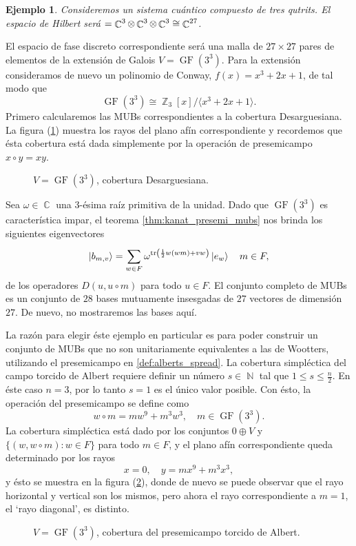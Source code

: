 \documentclass[a4paper]{report}
\DeclareMathOperator{\C}{\mathbb{C}}
\DeclareMathOperator{\N}{\mathbb{N}}
\DeclareMathOperator{\Z}{\mathbb{Z}}
\let\H\relax
\DeclareMathOperator{\H}{\mathcal H}
\DeclareMathOperator{\tr}{tr}
\DeclareMathOperator{\GF}{GF}
\newtheorem{example}{Ejemplo}
\begin{document}
  \begin{example}
    Consideremos un sistema cuántico compuesto de tres
    qutrits. El espacio de Hilbert será $\H = \C^{3} \otimes
    \C^{3} \otimes \C^{3} \cong \C^{27}$.   
    \label{ex:qs-3-3}
  \end{example}
  El espacio de fase discreto correspondiente será una malla
  de $27 \times 27$ pares de elementos de la extensión de
  Galois $V = \GF(3^{3})$. Para la extensión consideramos de
  nuevo un polinomio de Conway, $f(x) = x^3 + 2x + 1$, de
  tal modo que
  \[
    \GF(3^{3}) \cong \Z_3[x] / \langle x^3+2x+1 \rangle.
  \] 
  Primero calcularemos las MUBs correspondientes a la
  cobertura Desarguesiana. La figura
  (\ref{fig:3-3-desarguesian-plane}) muestra los rayos del
  plano afín correspondiente y recordemos que ésta cobertura
  está dada simplemente por la operación de presemicampo $x
  \circ y = xy$.
  \begin{figure}[ht]
    \centering
    
    \caption{$V = \GF(3^{3})$, cobertura Desarguesiana.}
    \label{fig:3-3-desarguesian-plane}
  \end{figure}
  Sea $\omega \in \C$ una $3$-ésima raíz primitiva de la
  unidad. Dado que $\GF(3^3)$ es característica impar, el
  teorema \ref{thm:kanat_presemi_mubs} nos brinda los
  siguientes eigenvectores
  \begin{equation}
    \ket{b_{m,v}}
    = \sum_{w \in F}^{}
    \omega^{\tr\left(
        \frac{1}{2} w(wm) + vw
    \right) } \ket{e_w}
    \quad m \in F,
  \end{equation}
  de los operadores $D(u,u \circ m)$ para todo $u \in F$. El
  conjunto completo de MUBs es un conjunto de $28$ bases
  mutuamente insesgadas de $27$ vectores de dimensión $27$.
  De nuevo, no mostraremos las bases aquí.

  La razón para elegir éste ejemplo en particular es para
  poder construir un conjunto de MUBs que no son
  unitariamente equivalentes a las de Wootters, utilizando
  el presemicampo en \ref{def:alberts_spread}. La cobertura
  simpléctica del campo torcido de Albert requiere definir
  un número $s \in \N$ tal que $1 \leq s \leq \frac{n}{2}$.
  En éste caso $n = 3$, por lo tanto $s = 1$ es el único
  valor posible. Con ésto, la operación del presemicampo se
  define como
  \[
    w \circ m
    = m w^{9} + m^{3}w^{3},
    \quad m \in \GF(3^{3}).
  \] 
  La cobertura simpléctica está dado por los conjuntos $0
  \oplus V$ y $\{(w,w\circ m) : w \in F\}$ para todo $m \in
  F$, y el plano afín correspondiente queda determinado por
  los rayos
  \[
    x = 0,
    \quad
    y = mx^{9} + m^3 x^3,
  \] 
  y ésto se muestra en la figura
  (\ref{fig:3-3-albert-plane}), donde de nuevo se puede
  observar que el rayo horizontal y vertical son los mismos,
  pero ahora el rayo correspondiente a $m = 1$, el `rayo
  diagonal', es distinto.
  \begin{figure}[ht]
    \centering
    \scalebox{1}{
      
    }
    \caption{$V = \GF(3^{3})$, cobertura del presemicampo
    torcido de Albert.}
    \label{fig:3-3-albert-plane}
  \end{figure}
\end{document}
